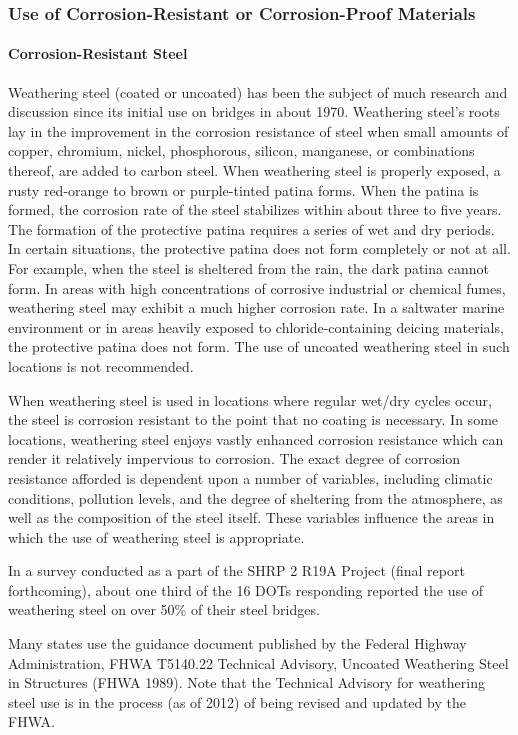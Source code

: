 \subsubsection{Use of Corrosion-Resistant or Corrosion-Proof Materials}

\paragraph{Corrosion-Resistant Steel}
Weathering steel (coated or uncoated) has been the subject of much research and discussion since its initial use
on bridges in about 1970. Weathering steel’s roots lay in the improvement in the corrosion resistance of steel when
small amounts of copper, chromium, nickel, phosphorous, silicon, manganese, or combinations thereof, are added to
carbon steel. When weathering steel is properly exposed, a rusty red-orange to brown or purple-tinted patina forms.
When the patina is formed, the corrosion rate of the steel stabilizes within about three to five years. The formation of
the protective patina requires a series of wet and dry periods. In certain situations, the protective patina does not form
completely or not at all. For example, when the steel is sheltered from the rain, the dark patina cannot form. In areas
with high concentrations of corrosive industrial or chemical fumes, weathering steel may exhibit a much higher
corrosion rate. In a saltwater marine environment or in areas heavily exposed to chloride-containing deicing
materials, the protective patina does not form. The use of uncoated weathering steel in such locations is not
recommended.

When weathering steel is used in locations where regular wet/dry cycles occur, the steel is corrosion resistant to
the point that no coating is necessary. In some locations, weathering steel enjoys vastly enhanced corrosion resistance
which can render it relatively impervious to corrosion. The exact degree of corrosion resistance afforded is dependent
upon a number of variables, including climatic conditions, pollution levels, and the degree of sheltering from the
atmosphere, as well as the composition of the steel itself. These variables influence the areas in which the use of
weathering steel is appropriate.

In a survey conducted as a part of the SHRP 2 R19A Project (final report forthcoming), about one third of the 16
DOTs responding reported the use of weathering steel on over 50\% of their steel bridges.

Many states use the guidance document published by the Federal Highway Administration, FHWA T5140.22
Technical Advisory, Uncoated Weathering Steel in Structures (FHWA 1989). Note that the Technical Advisory for
weathering steel use is in the process (as of 2012) of being revised and updated by the FHWA.


